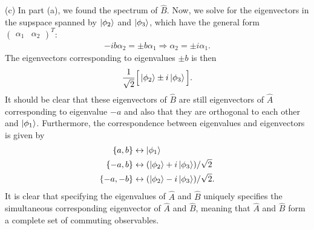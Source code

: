 {(c) In part (a), we found the spectrum of $\hat{B}$.
Now, we solve for the eigenvectors in the supspace spanned by $\ket{\phi_2}$ and $\ket{\phi_3}$, which have the general form $\begin{pmatrix} \alpha_1 & \alpha_2 \end{pmatrix}^{T}$:
\begin{eqnarray}
    -ib \alpha_2 = \pm b \alpha_1 \Rightarrow \alpha_2 = \pm i \alpha_1
.\end{eqnarray}
The eigenvectors corresponding to eigenvalues $\pm b$ is then 
\begin{eqnarray}
    \frac{1}{\sqrt{2}} \Big[ \ket{\phi_2} \pm i \ket{\phi_3} \Big]
.\end{eqnarray}
It should be clear that these eigenvectors of $\hat{B}$ are still eigenvectors of $\hat{A}$ corresponding to eigenvalue $-a$ and also that they are orthogonal to each other and $\ket{\phi_1}$.
Furthermore, the correspondence between eigenvalues and eigenvectors is given by
\begin{align}
    \{ a,b \} &\leftrightarrow \ket{\phi_1} \\
    \{ -a, b \}  &\leftrightarrow (\ket{\phi_2} + i \ket{\phi_3})/\sqrt{2} \\
    \{ -a,-b \}  &\leftrightarrow (\ket{\phi_2} - i\ket{\phi_3})/\sqrt{2}
.\end{align}
It is clear that specifying the eigenvalues of $\hat{A}$ and $\hat{B}$ uniquely specifies the simultaneous corresponding eigenvector of $\hat{A}$ and $\hat{B}$, meaning that $\hat{A}$ and $\hat{B}$ form a complete set of commuting observables.


}


